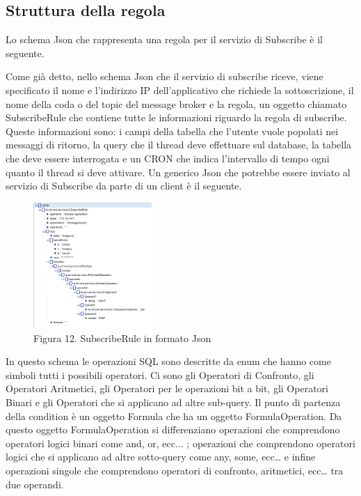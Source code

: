 \subsection{Struttura della regola}
Lo schema Json che rappresenta una regola per il servizio di Subscribe è il seguente. 
{\selectfont
	
}
Come già detto, nello schema Json che il servizio di subscribe riceve, viene specificato il nome e l’indirizzo IP dell’applicativo che richiede la sottoscrizione, il nome della coda o del topic del message broker e la regola, un oggetto chiamato SubscribeRule che contiene tutte le informazioni riguardo la regola di subscribe. Queste informazioni sono: i campi della tabella che l’utente vuole popolati nei messaggi di ritorno, la query che il thread deve effettuare sul database, la tabella che deve essere interrogata e un CRON che indica l’intervallo di tempo ogni quanto il thread si deve attivare.
\clearpage
Un generico Json che potrebbe essere inviato al servizio di Subscribe da parte di un client è il seguente.
\begin{figure}[h]
	\centering
	\includegraphics[width=0.4\textwidth]{subscribe-json-1.png}
	\caption*{Figura 12. SubscribeRule in formato Json}
\end{figure}
\par
In questo schema le operazioni SQL sono descritte da enum che hanno come simboli tutti i possibili operatori. Ci sono gli Operatori di Confronto, gli Operatori Aritmetici, gli Operatori per le operazioni bit a bit, gli Operatori Binari e gli Operatori che si applicano ad altre sub-query. Il punto di partenza della condition è un oggetto Formula che ha un oggetto FormulaOperation. Da questo oggetto FormulaOperation si differenziano operazioni che comprendono operatori logici binari come and, or, ecc... ; operazioni che comprendono operatori logici che si applicano ad altre sotto-query come any, some, ecc… e infine operazioni singole che comprendono operatori di confronto, aritmetici, ecc… tra due operandi.
